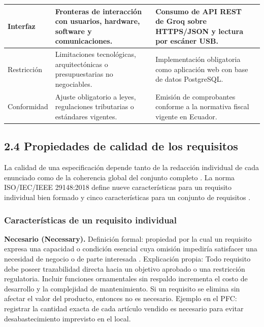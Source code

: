 \documentclass[onecolumn,12pt]{IEEEtran}
\begin{document}
\begin{longtable}{>{\raggedright\arraybackslash}p{2.6cm} >{\raggedright\arraybackslash}p{5.2cm} >{\raggedright\arraybackslash}p{5.2cm} >{\raggedright\arraybackslash}p{2.0cm}}
		\midrule
		Interfaz & Fronteras de interacci\'on con usuarios, hardware, software y comunicaciones. & Consumo de API REST de Groq sobre HTTPS/JSON y lectura por esc\'aner USB. & \cite{iso29148,hull2011} \\
		\midrule
		Restricci\'on & Limitaciones tecnol\'ogicas, arquitect\'onicas o presupuestarias no negociables. & Implementaci\'on obligatoria como aplicaci\'on web con base de datos PostgreSQL. & \cite{pohl2025,glinz2007,ireb2023} \\
		\midrule
		Conformidad & Ajuste obligatorio a leyes, regulaciones tributarias o est\'andares vigentes. & Emisi\'on de comprobantes conforme a la normativa fiscal vigente en Ecuador. & \cite{iso29148,swebok4} \\
	\end{longtable}
	
	\subsection{2.4 Propiedades de calidad de los requisitos}
	
	La calidad de una especificaci\'on depende tanto de la redacci\'on individual de cada enunciado como de la coherencia global del conjunto completo \cite{iso29148,pohl2025,ireb2023}. La norma ISO/IEC/IEEE 29148:2018 define nueve caracter\'isticas para un requisito individual bien formado y cinco caracter\'isticas para un conjunto de requisitos \cite{iso29148}. 
	
	\subsubsection*{Caracter\'isticas de un requisito individual}
	
	\textbf{Necesario (Necessary).} Definici\'on formal: propiedad por la cual un requisito expresa una capacidad o condici\'on esencial cuya omisi\'on impedir\'ia satisfacer una necesidad de negocio o de parte interesada \cite{iso29148,ireb2023}. Explicaci\'on propia: Todo requisito debe poseer trazabilidad directa hacia un objetivo aprobado o una restricci\'on regulatoria. Incluir funciones ornamentales sin respaldo incrementa el costo de desarrollo y la complejidad de mantenimiento. Si un requisito se elimina sin afectar el valor del producto, entonces no es necesario. Ejemplo en el PFC: registrar la cantidad exacta de cada art\'iculo vendido es necesario para evitar desabastecimiento imprevisto en el local.
	
\end{document}
